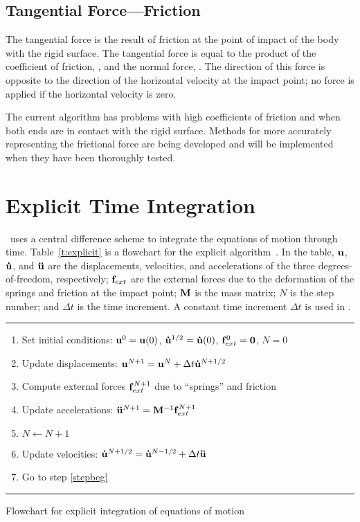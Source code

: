 \subsection{Tangential Force---Friction}

The tangential force is the result of friction at the point of impact of
the body with the rigid surface.  The tangential force is equal to the
product of the coefficient of friction, , and the normal force,
.  The direction of this force is opposite to the direction of
the horizontal velocity at the impact point; no force is applied if the
horizontal velocity is zero.   

The current algorithm has problems with high coefficients of friction
and when both ends are in contact with the rigid surface. Methods for
more accurately representing the frictional force are being developed
and will be implemented when they have been thoroughly tested.

\section{Explicit Time Integration} 
\SLAP\ uses a central difference scheme to integrate the equations of
motion through time. Table~\ref{t:explicit} is a flowchart for the
explicit algorithm~\cite{Belyt}.  In the table, ${\bf u}$, ${\bf \dot u}$, and
${\bf \ddot u}$ are the displacements, velocities, and accelerations of the
three degrees-of-freedom, respectively; ${\bf f}_{ext}$ are the external
forces due to the deformation of the springs and friction at the
impact point; ${\bf M}$ is the mass matrix; $N$ is the step number;
and $\Delta t$ is the time increment.  A constant time increment
$\Delta t$ is used in \SLAP. 

\begin{table}[ht]
\begingroup\itemsep 0pt
\hrule
\begin{enumerate}
\item Set initial conditions: ${\bf u}^0 = {\bf u}(0)$, ${\bf \dot u}^{1/2}
= {\bf \dot u}(0)$, ${\bf f}_{ext}^0 = {\bf 0}$, $N=0$
\item\label{stepbeg} Update displacements: ${\bf u}^{N+1} = {\bf u}^N + \Delta
t{\bf \dot u}^{N+1/2}$ 
\item Compute external forces ${\bf f}_{ext}^{N+1}$ due to ``springs'' and
friction
\item Update accelerations: ${\bf \ddot u}^{N+1} = {\bf M}^{-1} {\bf f}_{ext}^{N+1}$
\item $N \leftarrow N+1$
\item Update velocities: ${\bf \dot u}^{N+1/2} = {\bf \dot u}^{N-1/2} + \Delta t{\bf \ddot u}$
\item Go to step \ref{stepbeg}
\end{enumerate}
\hrule
\endgroup
\caption{Flowchart for explicit integration of equations of
motion}\label{t:explicit}
\end{table}


